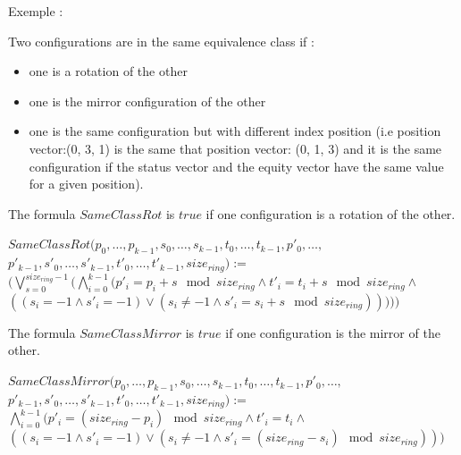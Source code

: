 \documentclass{article}
\begin{document}
\noindent Exemple :\newline

Two configurations are in the same equivalence class if :
\begin{itemize}
    \item one is a rotation of the other
    \item one is the mirror configuration of the other
    \item one is the same configuration but with different index position (i.e position vector:\newline (0, 3, 1) is the same that position vector: (0, 1, 3) and it is the same configuration if the status vector and the equity vector have the same value for a given position).
\end{itemize}

\noindent The formula $SameClassRot$ is $true$ if one configuration is a rotation of the other.

\begin{center}
    
$SameClassRot(p_{0}, \dots, p_{k-1}, s_{0}, \dots, s_{k-1}, t_{0}, \dots, t_{k-1}, p'_{0}, \dots,$\\
$p'_{k-1}, s'_{0}, \dots, s'_{k-1}, t'_{0}, \dots, t'_{k-1}, size_{ring}):=$\\
$(\bigvee_{s=0}^{size_{ring}-1} ( \bigwedge_{i=0}^{k-1} (p'_{i} = p_{i}+s \mod{size_{ring}} \land t'_{i} = t_{i}+s \mod{size_{ring}} \land$\\
$((s_{i} = -1 \land s'_{i} = -1) \lor (s_{i} \not= -1 \land s'_{i} = s_{i}+s \mod{size_{ring}}) ) ) ))$
\end{center}

\noindent The formula $SameClassMirror$ is $true$ if one configuration is the mirror of the other.

\begin{center}
    
    $SameClassMirror(p_{0}, \dots, p_{k-1}, s_{0}, \dots, s_{k-1}, t_{0}, \dots, t_{k-1}, p'_{0}, \dots,$\\
    $p'_{k-1}, s'_{0}, \dots, s'_{k-1}, t'_{0}, \dots, t'_{k-1}, size_{ring}):=$\\
    $\bigwedge_{i=0}^{k-1}( p'_{i} = (size_{ring} - p_{i})\mod{size_{ring}} \land t'_{i} = t_{i} \land$ \\
    $((s_{i} = -1 \land s'_{i} = -1) \lor (s_{i} \not= -1 \land s'_{i} = (size_{ring} - s_{i})\mod{size_{ring}}))) $
\end{center}
\end{document}
